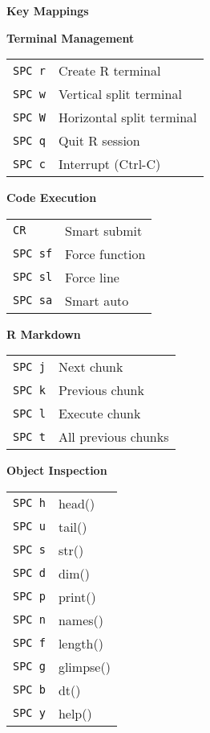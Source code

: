 \documentclass[10pt,landscape,a4paper]{article}
\begin{document}
\begin{multicols}{3}
\footnotesize

\textbf{\large Key Mappings}

\textbf{Terminal Management}\\
\begin{tabular}{@{}L{0.8cm}L{2.2cm}@{}}
\texttt{SPC r} & Create R terminal \\
\texttt{SPC w} & Vertical split terminal \\
\texttt{SPC W} & Horizontal split terminal \\
\texttt{SPC q} & Quit R session \\
\texttt{SPC c} & Interrupt (Ctrl-C) \\
\end{tabular}

\vspace{3pt}
\textbf{Code Execution}\\
\begin{tabular}{@{}L{0.8cm}L{2.2cm}@{}}
\texttt{CR} & Smart submit \\
\texttt{SPC sf} & Force function \\
\texttt{SPC sl} & Force line \\
\texttt{SPC sa} & Smart auto \\
\end{tabular}

\vspace{3pt}
\textbf{R Markdown}\\
\begin{tabular}{@{}L{0.8cm}L{2.2cm}@{}}
\texttt{SPC j} & Next chunk \\
\texttt{SPC k} & Previous chunk \\
\texttt{SPC l} & Execute chunk \\
\texttt{SPC t} & All previous chunks \\
\end{tabular}

\vspace{3pt}
\textbf{Object Inspection}\\
\begin{tabular}{@{}L{0.8cm}L{2.2cm}@{}}
\texttt{SPC h} & head() \\
\texttt{SPC u} & tail() \\
\texttt{SPC s} & str() \\
\texttt{SPC d} & dim() \\
\texttt{SPC p} & print() \\
\texttt{SPC n} & names() \\
\texttt{SPC f} & length() \\
\texttt{SPC g} & glimpse() \\
\texttt{SPC b} & dt() \\
\texttt{SPC y} & help() \\
\end{tabular}


\end{multicols}
\end{document}
